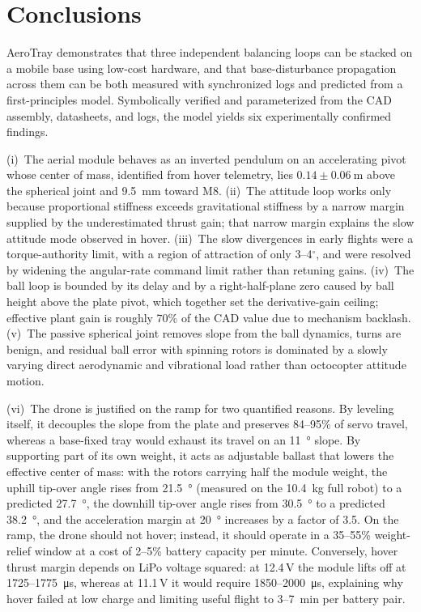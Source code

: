 \section{Conclusions}
\label{sec:conclusions}
AeroTray demonstrates that three independent balancing loops can be stacked on a mobile base using low-cost hardware, and that base-disturbance propagation across them can be both measured with synchronized logs and predicted from a first-principles model. Symbolically verified and parameterized from the CAD assembly, datasheets, and logs, the model yields six experimentally confirmed findings.

(i)~The aerial module behaves as an inverted pendulum on an accelerating pivot whose center of mass, identified from hover telemetry, lies $0.14\pm\SI{0.06}{\metre}$ above the spherical joint and \SI{9.5}{\milli\metre} toward M8. (ii)~The attitude loop works only because proportional stiffness exceeds gravitational stiffness by a narrow margin supplied by the underestimated thrust gain; that narrow margin explains the slow attitude mode observed in hover. (iii)~The slow divergences in early flights were a torque-authority limit, with a region of attraction of only 3--4$^\circ$, and were resolved by widening the angular-rate command limit rather than retuning gains. (iv)~The ball loop is bounded by its delay and by a right-half-plane zero caused by ball height above the plate pivot, which together set the derivative-gain ceiling; effective plant gain is roughly 70\% of the CAD value due to mechanism backlash. (v)~The passive spherical joint removes slope from the ball dynamics, turns are benign, and residual ball error with spinning rotors is dominated by a slowly varying direct aerodynamic and vibrational load rather than octocopter attitude motion.

(vi)~The drone is justified on the ramp for two quantified reasons. By leveling itself, it decouples the slope from the plate and preserves 84--95\% of servo travel, whereas a base-fixed tray would exhaust its travel on an \SI{11}{\degree} slope. By supporting part of its own weight, it acts as adjustable ballast that lowers the effective center of mass: with the rotors carrying half the module weight, the uphill tip-over angle rises from \SI{21.5}{\degree} (measured on the \SI{10.4}{\kilo\gram} full robot) to a predicted \SI{27.7}{\degree}, the downhill tip-over angle rises from \SI{30.5}{\degree} to a predicted \SI{38.2}{\degree}, and the acceleration margin at \SI{20}{\degree} increases by a factor of 3.5. On the ramp, the drone should not hover; instead, it should operate in a 35--55\% weight-relief window at a cost of 2--5\% battery capacity per minute. Conversely, hover thrust margin depends on LiPo voltage squared: at 12.4\,V the module lifts off at 1725--\SI{1775}{\micro\second}, whereas at 11.1\,V it would require 1850--\SI{2000}{\micro\second}, explaining why hover failed at low charge and limiting useful flight to 3--\SI{7}{\minute} per battery pair.

